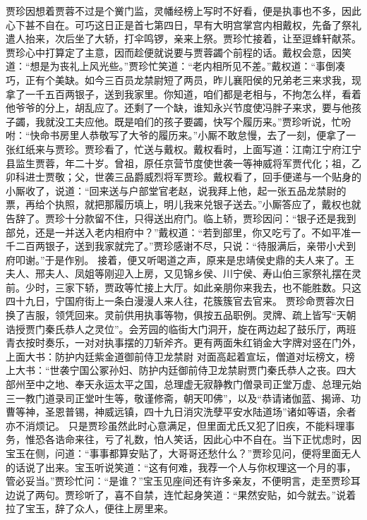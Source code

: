 \documentclass[12pt,oneside]{book}
\begin{document}
贾珍因想着贾蓉不过是个黉门监，灵幡经榜上写时不好看，便是执事也不多，因此心下甚不自在。可巧这日正是首七第四日，早有大明宫掌宫内相戴权，先备了祭礼遣人抬来，次后坐了大轿，打伞鸣锣，亲来上祭。贾珍忙接着，让至逗蜂轩献茶。贾珍心中打算定了主意，因而趁便就说要与贾蓉蠲个前程的话。戴权会意，因笑道：“想是为丧礼上风光些。”贾珍忙笑道：“老内相所见不差。”戴权道：“事倒凑巧，正有个美缺。如今三百员龙禁尉短了两员，昨儿襄阳侯的兄弟老三来求我，现拿了一千五百两银子，送到我家里。你知道，咱们都是老相与，不拘怎么样，看着他爷爷的分上，胡乱应了。还剩了一个缺，谁知永兴节度使冯胖子来求，要与他孩子蠲，我就没工夫应他。既是咱们的孩子要蠲，快写个履历来。”贾珍听说，忙吩咐：“快命书房里人恭敬写了大爷的履历来。”小厮不敢怠慢，去了一刻，便拿了一张红纸来与贾珍。贾珍看了，忙送与戴权。戴权看时，上面写道：江南江宁府江宁县监生贾蓉，年二十岁。曾祖，原任京营节度使世袭一等神威将军贾代化；祖，乙卯科进士贾敬；父，世袭三品爵威烈将军贾珍。戴权看了，回手便递与一个贴身的小厮收了，说道：“回来送与户部堂官老赵，说我拜上他，起一张五品龙禁尉的票，再给个执照，就把那履历填上，明儿我来兑银子送去。”小厮答应了，戴权也就告辞了。贾珍十分款留不住，只得送出府门。临上轿，贾珍因问：“银子还是我到部兑，还是一并送入老内相府中？”戴权道：“若到部里，你又吃亏了。不如平准一千二百两银子，送到我家就完了。”贾珍感谢不尽，只说：“待服满后，亲带小犬到府叩谢。”于是作别。
接着，便又听喝道之声，原来是忠靖侯史鼎的夫人来了。王夫人、邢夫人、凤姐等刚迎入上房，又见锦乡侯、川宁侯、寿山伯三家祭礼摆在灵前。少时，三家下轿，贾政等忙接上大厅。如此亲朋你来我去，也不能胜数。只这四十九日，宁国府街上一条白漫漫人来人往，花簇簇官去官来。
贾珍命贾蓉次日换了吉服，领凭回来。灵前供用执事等物，俱按五品职例。灵牌、疏上皆写“天朝诰授贾门秦氏恭人之灵位”。会芳园的临街大门洞开，旋在两边起了鼓乐厅，两班青衣按时奏乐，一对对执事摆的刀斩斧齐。更有两面朱红销金大字牌对竖在门外，上面大书：防护内廷紫金道御前侍卫龙禁尉
对面高起着宣坛，僧道对坛榜文，榜上大书：“世袭宁国公冢孙妇、防护内廷御前侍卫龙禁尉贾门秦氏恭人之丧。四大部州至中之地、奉天永运太平之国，总理虚无寂静教门僧录司正堂万虚、总理元始三一教门道录司正堂叶生等，敬谨修斋，朝天叩佛”，以及“恭请诸伽蓝、揭谛、功曹等神，圣恩普锡，神威远镇，四十九日消灾洗孽平安水陆道场”诸如等语，余者亦不消烦记。
只是贾珍虽然此时心意满足，但里面尤氏又犯了旧疾，不能料理事务，惟恐各诰命来往，亏了礼数，怕人笑话，因此心中不自在。当下正忧虑时，因宝玉在侧，问道：“事事都算安贴了，大哥哥还愁什么？”贾珍见问，便将里面无人的话说了出来。宝玉听说笑道：“这有何难，我荐一个人与你权理这一个月的事，管必妥当。”贾珍忙问：“是谁？”宝玉见座间还有许多亲友，不便明言，走至贾珍耳边说了两句。贾珍听了，喜不自禁，连忙起身笑道：“果然安贴，如今就去。”说着拉了宝玉，辞了众人，便往上房里来。
\end{document}
